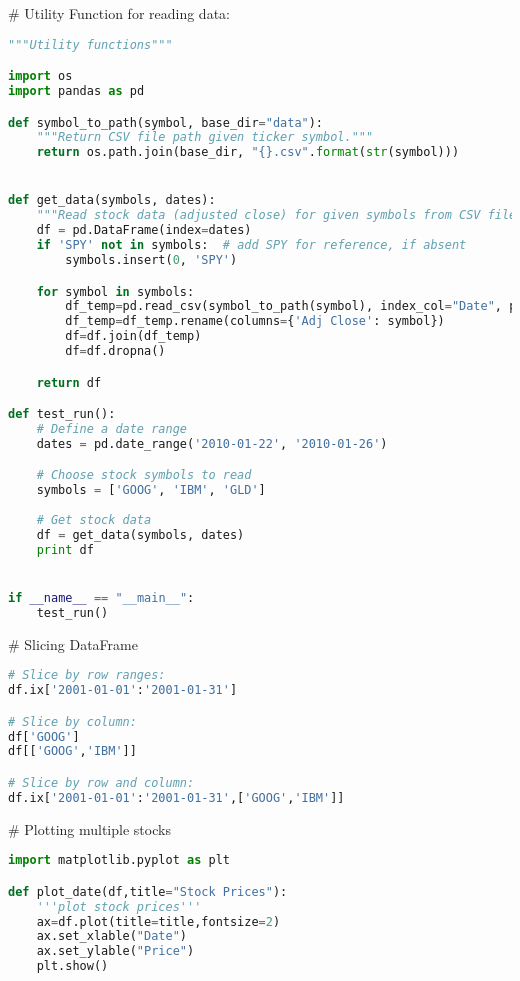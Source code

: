 \documentclass{article}
\begin{document}
\# Utility Function for reading data:
\begin{lstlisting}[language=Python]
"""Utility functions"""

import os
import pandas as pd

def symbol_to_path(symbol, base_dir="data"):
    """Return CSV file path given ticker symbol."""
    return os.path.join(base_dir, "{}.csv".format(str(symbol)))


def get_data(symbols, dates):
    """Read stock data (adjusted close) for given symbols from CSV files."""
    df = pd.DataFrame(index=dates)
    if 'SPY' not in symbols:  # add SPY for reference, if absent
        symbols.insert(0, 'SPY')

    for symbol in symbols:
        df_temp=pd.read_csv(symbol_to_path(symbol), index_col="Date", parse_dates=True, usecols=['Date','Adj Close'],na_values=['nan'])
        df_temp=df_temp.rename(columns={'Adj Close': symbol})
        df=df.join(df_temp)
        df=df.dropna()

    return df

def test_run():
    # Define a date range
    dates = pd.date_range('2010-01-22', '2010-01-26')

    # Choose stock symbols to read
    symbols = ['GOOG', 'IBM', 'GLD']
    
    # Get stock data
    df = get_data(symbols, dates)
    print df


if __name__ == "__main__":
    test_run()
\end{lstlisting}

\# Slicing DataFrame
\begin{lstlisting}[language=Python]
# Slice by row ranges:
df.ix['2001-01-01':'2001-01-31']

# Slice by column:
df['GOOG']
df[['GOOG','IBM']]

# Slice by row and column:
df.ix['2001-01-01':'2001-01-31',['GOOG','IBM']]
\end{lstlisting}

\# Plotting multiple stocks
\begin{lstlisting}[language=Python]
import matplotlib.pyplot as plt

def plot_date(df,title="Stock Prices"):
    '''plot stock prices'''
    ax=df.plot(title=title,fontsize=2)
    ax.set_xlable("Date")
    ax.set_ylable("Price")
    plt.show()
\end{lstlisting}
\end{document}
